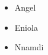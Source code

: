 \documentclass{article}
\begin{document}
	
	\begin{itemize}
		\item Angel
		\item Eniola
		\item Nnamdi
	\end{itemize}
\end{document}
